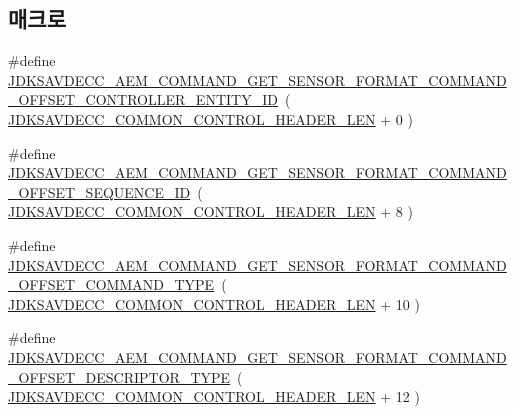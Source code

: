 \subsection*{매크로}
\begin{DoxyCompactItemize}
\item 
\#define \hyperlink{group__command__get__sensor__format_ga3ed734bd1f12c7532e522d581e5ccf99}{J\+D\+K\+S\+A\+V\+D\+E\+C\+C\+\_\+\+A\+E\+M\+\_\+\+C\+O\+M\+M\+A\+N\+D\+\_\+\+G\+E\+T\+\_\+\+S\+E\+N\+S\+O\+R\+\_\+\+F\+O\+R\+M\+A\+T\+\_\+\+C\+O\+M\+M\+A\+N\+D\+\_\+\+O\+F\+F\+S\+E\+T\+\_\+\+C\+O\+N\+T\+R\+O\+L\+L\+E\+R\+\_\+\+E\+N\+T\+I\+T\+Y\+\_\+\+ID}~( \hyperlink{group__jdksavdecc__avtp__common__control__header_gaae84052886fb1bb42f3bc5f85b741dff}{J\+D\+K\+S\+A\+V\+D\+E\+C\+C\+\_\+\+C\+O\+M\+M\+O\+N\+\_\+\+C\+O\+N\+T\+R\+O\+L\+\_\+\+H\+E\+A\+D\+E\+R\+\_\+\+L\+EN} + 0 )
\item 
\#define \hyperlink{group__command__get__sensor__format_ga361b344a4adafb5877af401e99b576ed}{J\+D\+K\+S\+A\+V\+D\+E\+C\+C\+\_\+\+A\+E\+M\+\_\+\+C\+O\+M\+M\+A\+N\+D\+\_\+\+G\+E\+T\+\_\+\+S\+E\+N\+S\+O\+R\+\_\+\+F\+O\+R\+M\+A\+T\+\_\+\+C\+O\+M\+M\+A\+N\+D\+\_\+\+O\+F\+F\+S\+E\+T\+\_\+\+S\+E\+Q\+U\+E\+N\+C\+E\+\_\+\+ID}~( \hyperlink{group__jdksavdecc__avtp__common__control__header_gaae84052886fb1bb42f3bc5f85b741dff}{J\+D\+K\+S\+A\+V\+D\+E\+C\+C\+\_\+\+C\+O\+M\+M\+O\+N\+\_\+\+C\+O\+N\+T\+R\+O\+L\+\_\+\+H\+E\+A\+D\+E\+R\+\_\+\+L\+EN} + 8 )
\item 
\#define \hyperlink{group__command__get__sensor__format_ga3e19668457f511d185fc9bdce9ab7bd0}{J\+D\+K\+S\+A\+V\+D\+E\+C\+C\+\_\+\+A\+E\+M\+\_\+\+C\+O\+M\+M\+A\+N\+D\+\_\+\+G\+E\+T\+\_\+\+S\+E\+N\+S\+O\+R\+\_\+\+F\+O\+R\+M\+A\+T\+\_\+\+C\+O\+M\+M\+A\+N\+D\+\_\+\+O\+F\+F\+S\+E\+T\+\_\+\+C\+O\+M\+M\+A\+N\+D\+\_\+\+T\+Y\+PE}~( \hyperlink{group__jdksavdecc__avtp__common__control__header_gaae84052886fb1bb42f3bc5f85b741dff}{J\+D\+K\+S\+A\+V\+D\+E\+C\+C\+\_\+\+C\+O\+M\+M\+O\+N\+\_\+\+C\+O\+N\+T\+R\+O\+L\+\_\+\+H\+E\+A\+D\+E\+R\+\_\+\+L\+EN} + 10 )
\item 
\#define \hyperlink{group__command__get__sensor__format_ga27ced9ca61e21385761c43642b952f7b}{J\+D\+K\+S\+A\+V\+D\+E\+C\+C\+\_\+\+A\+E\+M\+\_\+\+C\+O\+M\+M\+A\+N\+D\+\_\+\+G\+E\+T\+\_\+\+S\+E\+N\+S\+O\+R\+\_\+\+F\+O\+R\+M\+A\+T\+\_\+\+C\+O\+M\+M\+A\+N\+D\+\_\+\+O\+F\+F\+S\+E\+T\+\_\+\+D\+E\+S\+C\+R\+I\+P\+T\+O\+R\+\_\+\+T\+Y\+PE}~( \hyperlink{group__jdksavdecc__avtp__common__control__header_gaae84052886fb1bb42f3bc5f85b741dff}{J\+D\+K\+S\+A\+V\+D\+E\+C\+C\+\_\+\+C\+O\+M\+M\+O\+N\+\_\+\+C\+O\+N\+T\+R\+O\+L\+\_\+\+H\+E\+A\+D\+E\+R\+\_\+\+L\+EN} + 12 )

\end{DoxyCompactItemize}
